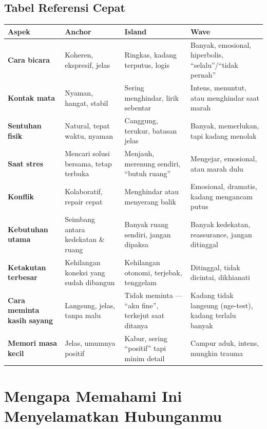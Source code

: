 \subsection{Tabel Referensi Cepat}

\begin{center}
\renewcommand{\arraystretch}{1.6}
\begin{tabular}{|>{\raggedright}p{2.8cm}|>{\raggedright}p{4.5cm}|>{\raggedright}p{4.5cm}|>{\raggedright\arraybackslash}p{4.5cm}|}
\hline
\rowcolor{primary!20}
\textbf{Aspek} & \textbf{Anchor} & \textbf{Island} & \textbf{Wave} \\
\hline
\textbf{Cara bicara} & Koheren, ekspresif, jelas & Ringkas, kadang terputus, logis & Banyak, emosional, hiperbolis, ``selalu''/``tidak pernah'' \\
\hline
\textbf{Kontak mata} & Nyaman, hangat, stabil & Sering menghindar, lirik sebentar & Intens, menuntut, atau menghindar saat marah \\
\hline
\textbf{Sentuhan fisik} & Natural, tepat waktu, nyaman & Canggung, terukur, batasan jelas & Banyak, memerlukan, tapi kadang menolak \\
\hline
\textbf{Saat stres} & Mencari solusi bersama, tetap terbuka & Menjauh, merenung sendiri, ``butuh ruang'' & Mengejar, emosional, atau marah dulu \\
\hline
\textbf{Konflik} & Kolaboratif, repair cepat & Menghindar atau menyerang balik & Emosional, dramatis, kadang mengancam putus \\
\hline
\textbf{Kebutuhan utama} & Seimbang antara kedekatan \& ruang & Banyak ruang sendiri, jangan dipaksa & Banyak kedekatan, reassurance, jangan ditinggal \\
\hline
\textbf{Ketakutan terbesar} & Kehilangan koneksi yang sudah dibangun & Kehilangan otonomi, terjebak, tenggelam & Ditinggal, tidak dicintai, dikhianati \\
\hline
\textbf{Cara meminta kasih sayang} & Langsung, jelas, tanpa malu & Tidak meminta --- ``aku fine'', terkejut saat ditanya & Kadang tidak langsung (nge-test), kadang terlalu banyak \\
\hline
\textbf{Memori masa kecil} & Jelas, umumnya positif & Kabur, sering ``positif'' tapi minim detail & Campur aduk, intens, mungkin trauma \\
\hline
\end{tabular}
\end{center}

\section{Mengapa Memahami Ini Menyelamatkan Hubunganmu}

